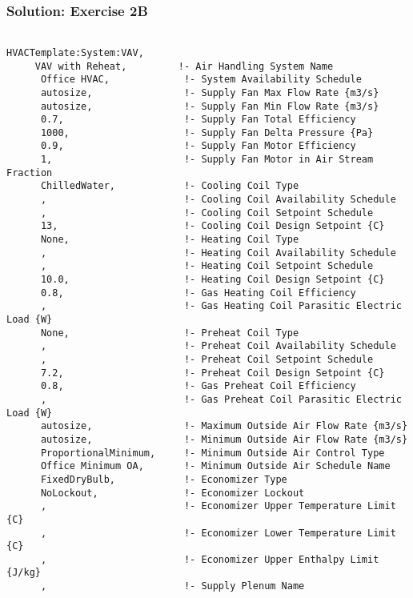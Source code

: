 \subsubsection{Solution: Exercise 2B}\label{solution-exercise-2b}

\begin{lstlisting}

HVACTemplate:System:VAV,
     VAV with Reheat,         !- Air Handling System Name
      Office HVAC,             !- System Availability Schedule
      autosize,                !- Supply Fan Max Flow Rate {m3/s}
      autosize,                !- Supply Fan Min Flow Rate {m3/s}
      0.7,                     !- Supply Fan Total Efficiency
      1000,                    !- Supply Fan Delta Pressure {Pa}
      0.9,                     !- Supply Fan Motor Efficiency
      1,                       !- Supply Fan Motor in Air Stream Fraction
      ChilledWater,            !- Cooling Coil Type
      ,                        !- Cooling Coil Availability Schedule
      ,                        !- Cooling Coil Setpoint Schedule
      13,                      !- Cooling Coil Design Setpoint {C}
      None,                    !- Heating Coil Type
      ,                        !- Heating Coil Availability Schedule
      ,                        !- Heating Coil Setpoint Schedule
      10.0,                    !- Heating Coil Design Setpoint {C}
      0.8,                     !- Gas Heating Coil Efficiency
      ,                        !- Gas Heating Coil Parasitic Electric Load {W}
      None,                    !- Preheat Coil Type
      ,                        !- Preheat Coil Availability Schedule
      ,                        !- Preheat Coil Setpoint Schedule
      7.2,                     !- Preheat Coil Design Setpoint {C}
      0.8,                     !- Gas Preheat Coil Efficiency
      ,                        !- Gas Preheat Coil Parasitic Electric Load {W}
      autosize,                !- Maximum Outside Air Flow Rate {m3/s}
      autosize,                !- Minimum Outside Air Flow Rate {m3/s}
      ProportionalMinimum,     !- Minimum Outside Air Control Type
      Office Minimum OA,       !- Minimum Outside Air Schedule Name
      FixedDryBulb,            !- Economizer Type
      NoLockout,               !- Economizer Lockout
      ,                        !- Economizer Upper Temperature Limit {C}
      ,                        !- Economizer Lower Temperature Limit {C}
      ,                        !- Economizer Upper Enthalpy Limit {J/kg}
      ,                        !- Supply Plenum Name

\end{lstlisting}

